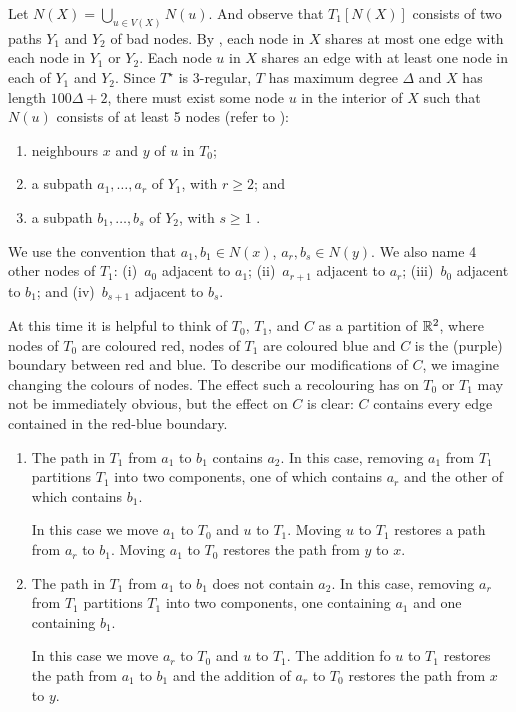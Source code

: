 \documentclass{patmorin}
\newcommand{\dual}[1]{{#1}^\star}
\begin{document}
Let $N(X)=\bigcup_{u\in V(X)} N(u)$.  And observe that
$T_1[N(X)]$ consists of two paths $Y_1$ and $Y_2$ of bad nodes.
By , each node in $X$ shares at most one edge
with each node in $Y_1$ or $Y_2$.  Each node $u$ in $X$ shares an edge
with at least one node in each of $Y_1$ and $Y_2$.  Since $\dual{T}$
is 3-regular, $T$ has maximum degree $\Delta$ and $X$ has length
$100\Delta+2$, there must exist some node $u$ in the interior of $X$
such that $N(u)$ consists of at least 5 nodes (refer to ):
\begin{enumerate}
   \item neighbours $x$ and $y$ of $u$ in $T_0$;
   \item a subpath $a_1,\ldots,a_r$ of $Y_1$, with $r\ge 2$; and
   \item a subpath $b_1,\ldots,b_s$ of $Y_2$, with $s\ge 1$ \enspace .
\end{enumerate}
We use the convention that $a_1,b_1\in N(x)$, $a_r,b_s\in N(y)$. We
also name 4 other nodes of $T_1$: (i)~$a_0$ adjacent to $a_1$;
(ii)~$a_{r+1}$ adjacent to $a_r$; (iii)~$b_0$ adjacent to $b_1$; and
(iv)~$b_{s+1}$ adjacent to $b_s$.

At this time it is helpful to think of $T_0$, $T_1$, and $C$ as a
partition of $\mathbb{R}^2$, where nodes of $T_0$ are coloured red, nodes of $T_1$
are coloured blue and $C$ is the (purple) boundary between red and blue.
To describe our modifications of $C$, we imagine changing the colours
of nodes.  The effect such a recolouring has on $T_0$ or $T_1$ may not
be immediately obvious, but the effect on $C$ is clear: $C$ contains
every edge contained in the red-blue boundary.

\begin{enumerate}
   \item The path in $T_1$ from $a_1$ to $b_1$ contains $a_2$.
     In this case, removing $a_1$ from $T_1$ partitions $T_1$ into two
     components, one of which contains $a_r$ and the other of which
     contains $b_1$.

     In this case we move $a_1$ to $T_0$ and $u$ to $T_1$.  Moving $u$
     to $T_1$ restores a path from $a_r$ to $b_1$.  Moving $a_1$ to $T_0$
     restores the path from $y$ to $x$.

   \item The path in $T_1$ from $a_1$ to $b_1$ does not contain $a_2$.
     In this case, removing $a_r$ from $T_1$ partitions $T_1$ into two
     components, one containing $a_1$ and one containing $b_1$.

     In this case we move $a_r$ to $T_0$ and $u$ to $T_1$. The addition fo
     $u$ to $T_1$ restores the path from $a_1$ to $b_1$ and the addition
     of $a_r$ to $T_0$ restores the path from $x$ to $y$.
\end{enumerate}
\end{document}
